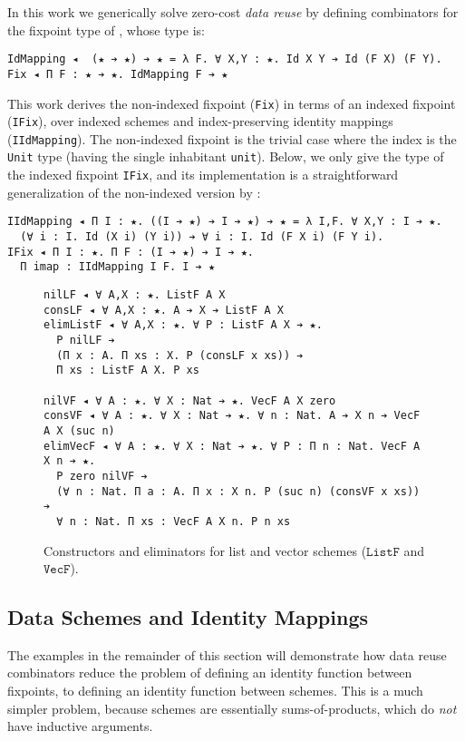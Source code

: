 \documentclass[acmsmall]{acmart}\settopmatter{}
\newcommand{\labsec}[1]{\label{sec:#1}}
\newcommand{\labfig}[1]{\label{fig:#1}}
\newcommand{\txt}[1]{\ensuremath{\texttt{#1}}}
\begin{document}
In this work we generically solve zero-cost \emph{data reuse} by defining
combinators for the fixpoint type of \citet{firsov18b}, whose type is:
\begin{verbatim}
IdMapping ◂  (★ ➔ ★) ➔ ★ = λ F. ∀ X,Y : ★. Id X Y ➔ Id (F X) (F Y).
Fix ◂ Π F : ★ ➔ ★. IdMapping F ➔ ★
\end{verbatim}
This work derives the non-indexed fixpoint (\verb;Fix;) in terms of an
indexed fixpoint (\verb;IFix;), over indexed schemes and
index-preserving identity mappings (\verb;IIdMapping;). The
non-indexed fixpoint is the trivial case where the index is the
\verb;Unit; type (having the single inhabitant \verb;unit;). Below, we
only give the type of the indexed fixpoint \verb;IFix;, and its
implementation is a straightforward generalization of the non-indexed
version by \citet{firsov18b}:
\begin{verbatim}
IIdMapping ◂ Π I : ★. ((I ➔ ★) ➔ I ➔ ★) ➔ ★ = λ I,F. ∀ X,Y : I ➔ ★. 
  (∀ i : I. Id (X i) (Y i)) ➔ ∀ i : I. Id (F X i) (F Y i).
IFix ◂ Π I : ★. Π F : (I ➔ ★) ➔ I ➔ ★. 
  Π imap : IIdMapping I F. I ➔ ★
\end{verbatim}

\begin{figure}
\centering

\begin{verbatim}
nilLF ◂ ∀ A,X : ★. ListF A X
consLF ◂ ∀ A,X : ★. A ➔ X ➔ ListF A X
elimListF ◂ ∀ A,X : ★. ∀ P : ListF A X ➔ ★.
  P nilLF ➔
  (Π x : A. Π xs : X. P (consLF x xs)) ➔
  Π xs : ListF A X. P xs

nilVF ◂ ∀ A : ★. ∀ X : Nat ➔ ★. VecF A X zero
consVF ◂ ∀ A : ★. ∀ X : Nat ➔ ★. ∀ n : Nat. A ➔ X n ➔ VecF A X (suc n)
elimVecF ◂ ∀ A : ★. ∀ X : Nat ➔ ★. ∀ P : Π n : Nat. VecF A X n ➔ ★.
  P zero nilVF ➔
  (∀ n : Nat. Π a : A. Π x : X n. P (suc n) (consVF x xs)) ➔ 
  ∀ n : Nat. Π xs : VecF A X n. P n xs
\end{verbatim}

\caption{Constructors and eliminators for list and vector schemes (\txt{ListF} and \txt{VecF}).}
\labfig{schemes}
\end{figure}

\subsection{Data Schemes and Identity Mappings}
\labsec{data:schemes}

The examples in the remainder of this section will demonstrate how
data reuse combinators reduce the problem of defining an identity
function between fixpoints, to defining an identity function between
schemes. This is a much simpler problem, because schemes are
essentially sums-of-products, which do \textit{not} have inductive
arguments.
\end{document}
